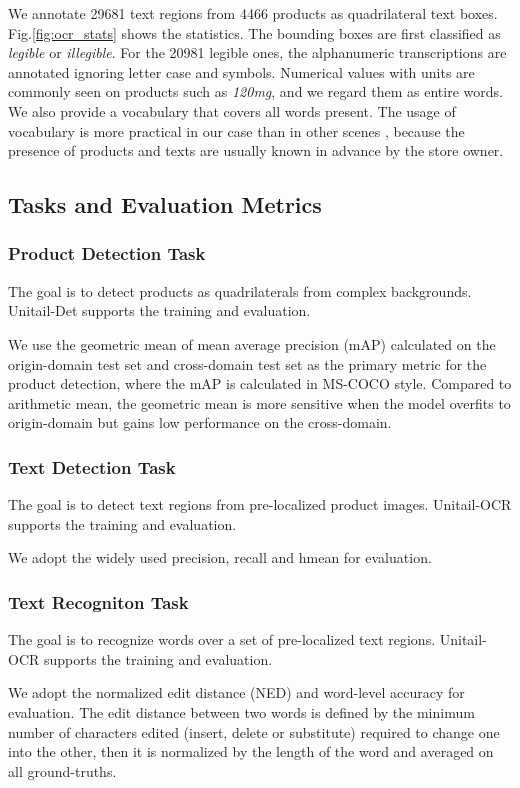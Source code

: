\documentclass[runningheads]{llncs}
\begin{document}
We annotate 29681 text regions from 4466 products as quadrilateral text boxes. Fig.\ref{fig:ocr_stats} shows the statistics. The bounding boxes are first classified as \textit{legible} or \textit{illegible}. For the 20981 legible ones, the alphanumeric transcriptions are annotated ignoring letter case and symbols. Numerical values with units are commonly seen on products such as \textit{120mg}, and we regard them as entire words. We also provide a vocabulary that covers all words present. The usage of vocabulary is more practical in our case than in other scenes \cite{ICDAR15}, because the presence of products and texts are usually known in advance by the store owner. 

\subsection{Tasks and Evaluation Metrics}
\subsubsection{Product Detection Task}
The goal is to detect products as quadrilaterals from complex backgrounds. Unitail-Det supports the training and evaluation.

We use the geometric mean of mean average precision (mAP) calculated on the origin-domain test set and cross-domain test set as the primary metric for the product detection, where the mAP is calculated in MS-COCO style\cite{lin2014microsoft}. Compared to arithmetic mean, the geometric mean is more sensitive when the model overfits to origin-domain but gains low performance on the cross-domain. 


\subsubsection{Text Detection Task}
The goal is to detect text regions from pre-localized product images. Unitail-OCR supports the training and evaluation.

We adopt the widely used precision, recall and hmean \cite{ICDAR15,ctw1500} for evaluation. 

\subsubsection{Text Recogniton Task}
The goal is to recognize words over a set of pre-localized text regions. Unitail-OCR supports the training and evaluation.

We adopt the normalized edit distance (NED) \cite{icdar2013} and word-level accuracy for evaluation. The edit distance between two words is defined by the minimum number of characters edited (insert, delete or substitute) required to change one into the other, then it is normalized by the length of the word and averaged on all ground-truths.
\end{document}
